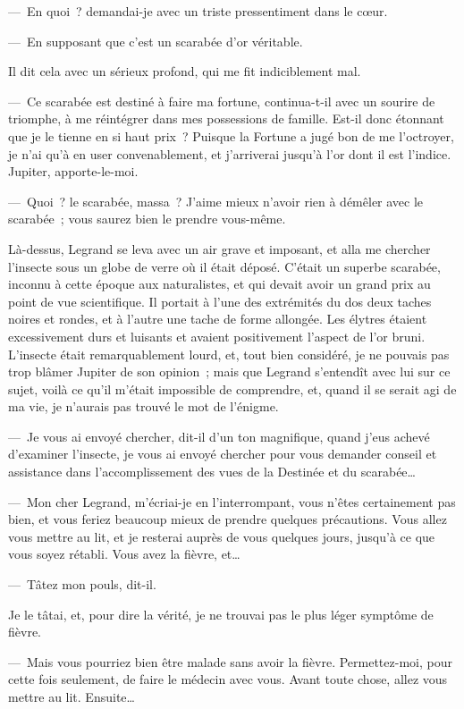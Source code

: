 \documentclass[french,twoside]{book} %
\begin{document}
— En quoi ? demandai-je avec un triste pressentiment dans le cœur.\par
— En supposant que c’est un scarabée d’or véritable.\par
Il dit cela avec un sérieux profond, qui me fit indiciblement mal.\par
— Ce scarabée est destiné à faire ma fortune, continua-t-il avec un sourire de triomphe, à me réintégrer dans mes possessions de famille. Est-il donc étonnant que je le tienne en si haut prix ? Puisque la Fortune a jugé bon de me l’octroyer, je n’ai qu’à en user convenablement, et j’arriverai jusqu’à l’or dont il est l’indice. Jupiter, apporte-le-moi.\par
— Quoi ? le scarabée, massa ? J’aime mieux n’avoir rien à démêler avec le scarabée ; vous saurez bien le prendre vous-même.\par
Là-dessus, Legrand se leva avec un air grave et imposant, et alla me chercher l’insecte sous un globe de verre où il était déposé. C’était un superbe scarabée, inconnu à cette époque aux naturalistes, et qui devait avoir un grand prix au point de vue scientifique. Il portait à l’une des extrémités du dos deux taches noires et rondes, et à l’autre une tache de forme allongée. Les élytres étaient excessivement durs et luisants et avaient positivement l’aspect de l’or bruni. L’insecte était remarquablement lourd, et, tout bien considéré, je ne pouvais pas trop blâmer Jupiter de son opinion ; mais que Legrand s’entendît avec lui sur ce sujet, voilà ce qu’il m’était impossible de comprendre, et, quand il se serait agi de ma vie, je n’aurais pas trouvé le mot de l’énigme.\par
— Je vous ai envoyé chercher, dit-il d’un ton magnifique, quand j’eus achevé d’examiner l’insecte, je vous ai envoyé chercher pour vous demander conseil et assistance dans l’accomplissement des vues de la Destinée et du scarabée…\par
— Mon cher Legrand, m’écriai-je en l’interrompant, vous n’êtes certainement pas bien, et vous feriez beaucoup mieux de prendre quelques précautions. Vous allez vous mettre au lit, et je resterai auprès de vous quelques jours, jusqu’à ce que vous soyez rétabli. Vous avez la fièvre, et…\par
— Tâtez mon pouls, dit-il.\par
Je le tâtai, et, pour dire la vérité, je ne trouvai pas le plus léger symptôme de fièvre.\par
— Mais vous pourriez bien être malade sans avoir la fièvre. Permettez-moi, pour cette fois seulement, de faire le médecin avec vous. Avant toute chose, allez vous mettre au lit. Ensuite…\par
\end{document}
